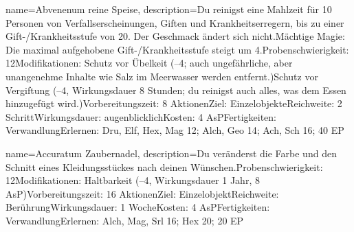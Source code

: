 {
    name={Abvenenum reine Speise},
    description={Du reinigst eine Mahlzeit für 10 Personen von Verfallserscheinungen, Giften und Krankheitserregern, bis zu einer Gift-/Krankheitsstufe von 20. Der Geschmack ändert sich nicht.\newline Mächtige Magie: Die maximal aufgehobene Gift-/Krankheitsstufe steigt um 4.\newline Probenschwierigkeit: 12\newline Modifikationen: Schutz vor Übelkeit (–4; auch ungefährliche, aber unangenehme Inhalte wie Salz im Meerwasser werden entfernt.)\newline Schutz vor Vergiftung (–4, Wirkungsdauer 8 Stunden; du reinigst auch alles, was dem Essen hinzugefügt wird.)\newline Vorbereitungszeit: 8 Aktionen\newline Ziel: Einzelobjekte\newline Reichweite: 2 Schritt\newline Wirkungsdauer: augenblicklich\newline Kosten: 4 AsP\newline Fertigkeiten: Verwandlung\newline Erlernen: Dru, Elf, Hex, Mag 12; Alch, Geo 14; Ach, Sch 16; 40 EP}
}


{
    name={Accuratum Zaubernadel},
    description={Du veränderst die Farbe und den Schnitt eines Kleidungsstückes nach deinen Wünschen.\newline Probenschwierigkeit: 12\newline Modifikationen: Haltbarkeit (–4, Wirkungsdauer 1 Jahr, 8 AsP)\newline Vorbereitungszeit: 16 Aktionen\newline Ziel: Einzelobjekt\newline Reichweite: Berührung\newline Wirkungsdauer: 1 Woche\newline Kosten: 4 AsP\newline Fertigkeiten: Verwandlung\newline Erlernen: Alch, Mag, Srl 16; Hex 20; 20 EP}
}


